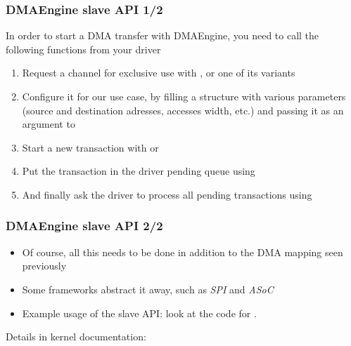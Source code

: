 \begin{frame}
  \frametitle{DMAEngine slave API 1/2}
    In order to start a DMA transfer with DMAEngine, you need to call the
    following functions from your driver
    \begin{enumerate}
    \item Request a channel for exclusive use with
      , or one of its variants
    \item Configure it for our use case, by filling a
       structure with various parameters
      (source and destination adresses, accesses width, etc.) and
      passing it as an argument to 
    \item Start a new transaction with
       or
    \item Put the transaction in the driver pending queue using
    \item And finally ask the driver to process all pending
      transactions using 
    \end{enumerate}
\end{frame}

\begin{frame}
  \frametitle{DMAEngine slave API 2/2}
  \begin{itemize}
  \item Of course, all this needs to be done in addition to the DMA
    mapping seen previously
  \item Some frameworks abstract it away, such as {\em SPI}
    and {\em ASoC}
  \item Example usage of the slave API: look at the code
    for .
  \end{itemize}
  Details in kernel documentation: 
\end{frame}

